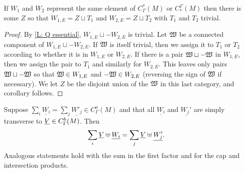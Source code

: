 \begin{corollary}\label{C: Q essential}
	If $W_1$ and $W_2$ represent the same element of $C^*_\Gamma(M)$ or $C_*^\Gamma(M)$ then there is some $Z$ so that $W_{1,E} = Z \sqcup T_1$ and $W_{2,E} = Z \sqcup T_2$ with $T_1$ and $T_2$ trivial.
\end{corollary}

\begin{proof}
	By \cref{L: Q essential}, $W_{1,E} \sqcup -W_{2,E}$ is trivial.
	Let $\mathfrak W$ be a connected component of $W_{1,E} \sqcup -W_{2,E}$.
	If $\mathfrak W$ is itself trivial, then we assign it to $T_1$ or $T_2$ according to whether it is in $W_{1,E}$ or $W_{2,E}$.
	If there is a pair $\mathfrak W \sqcup -\mathfrak W$ in $W_{1,E}$, then we assign the pair to $T_1$ and similarly for $W_{2,E}$.
	This leaves only pairs $\mathfrak W \sqcup -\mathfrak W$ so that $\mathfrak W \in W_{1,E}$ and $-\mathfrak W \in W_{2,E}$ (reversing the sign of $\mathfrak W$ if necessary).
	We let $Z$ be the disjoint union of the $\mathfrak W$ in this last category, and corollary follows.
\end{proof}

\begin{proposition}\label{P: multicup}
	Suppose $\sum_i \underline{W_i} = \sum_j \underline{W'_j} \in C_\Gamma^a(M)$ and that all $\underline{W_i}$ and $\underline{W_j'}$ are simply transverse to $\underline{V} \in C_\Gamma^b(M)$.
	Then $$\sum_i \underline{V} \uplus \underline{W_i} = \sum_j \underline{V}\uplus \underline{W'_j}.$$
	Analogous statements hold with the sum in the first factor and for the cap and intersection products.
\end{proposition}


